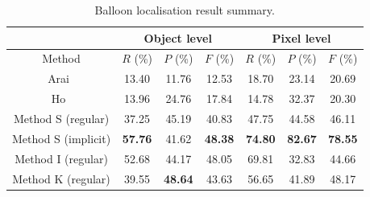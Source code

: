 \begin{table}[ht]
  \centering
  \caption{Balloon localisation result summary.}
  \begin{tabular}{|c|c|c|c|c|c|c|}
  \hline
    & \multicolumn{3}{|c|}{Object level}  & \multicolumn{3}{|c|}{Pixel level}   \\
  \hline
  Method  &  $ R$ (\%)  & $P$ (\%)& $F$ (\%)   &  $R$ (\%)  & $P$ (\%)   & $F$ (\%)\\
  \hline
  Arai~\cite{Arai11}& 13.40     & 11.76       & 12.53     & 18.70 & 23.14 & 20.69       \\
  \hline
  Ho~\cite{Ho2012}  & 13.96     & 24.76       & 17.84     & 14.78 & 32.37 & 20.30     \\
  \hline
  Method S (regular)& 37.25     & 45.19       & 40.83 & 47.75 & 44.58 & 46.11     \\
  \hline
  Method S (implicit)& \textbf{57.76} & 41.62 & \textbf{48.38}     & \textbf{74.80} & \textbf{82.67} & \textbf{78.55}      \\
  \hline
  Method I (regular) & 52.68     & 44.17                  & 48.05 & 69.81 & 32.83 & 44.66      \\
  \hline
  Method K (regular)  & 39.55   & \textbf{48.64} & 43.63  & 56.65 & 41.89 & 48.17      \\
  \hline
  \end{tabular}
      \label{tab:ex:balloon_localisation_comparison_results}
\end{table}%


  
  
